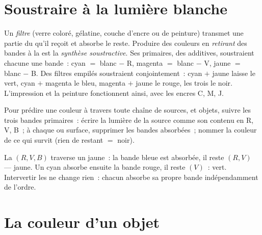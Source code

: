 \section{Soustraire à la lumière blanche}

\begin{definition}\label{def:g11:color-light-sources:subtractive}
Un \emph{filtre} (verre coloré, gélatine, couche d'encre
ou de peinture) transmet une partie du
 qu'il reçoit et absorbe le reste. Produire
des couleurs en \emph{retirant} des bandes à la
 est la \emph{synthèse
soustractive}. Ses primaires, 
des additives, soustraient chacune une bande~: cyan $=$ blanc $-$ R,
magenta $=$ blanc $-$ V, jaune $=$ blanc $-$ B. Des filtres empilés
soustraient conjointement~: cyan $+$ jaune laisse le vert, cyan $+$
magenta le bleu, magenta $+$ jaune le rouge, les trois le noir.
L'impression et la peinture fonctionnent ainsi, avec les encres C, M, J.
\end{definition}

\begin{method}\label{met:g11:color-light-sources:bookkeeping}
Pour prédire une couleur à travers toute chaîne de sources,
 et objets, suivre les trois bandes
primaires~: écrire la lumière de la source comme son contenu en R, V,
B~; à chaque  ou surface, supprimer
les bandes absorbées~; nommer la couleur de ce qui survit (rien de
restant $=$ noir).
\end{method}

\begin{example}\label{ex:g11:color-light-sources:chain}
La  $(R, V, B)$ traverse un
 jaune~: la bande bleue est absorbée,
il reste $(R, V)$ --- jaune. Un 
cyan absorbe ensuite la bande rouge, il reste $(V)$~: vert. Intervertir
les  ne change rien~: chacun absorbe
sa propre bande indépendamment de l'ordre.
\end{example}

\section{La couleur d'un objet}

